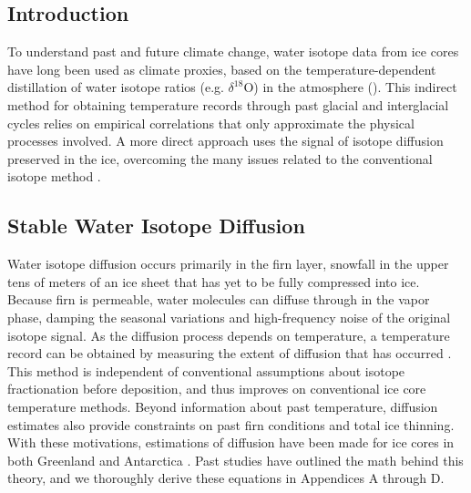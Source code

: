 \documentclass[draft, jgrga]{AGUTeX}
\begin{document}


\begin{article}

\section{Introduction}

To understand past and future climate change, water isotope data from ice cores have long been used as climate proxies, based on the temperature-dependent distillation of water isotope ratios (e.g. $\delta^{18}$O) in the atmosphere (\citep{Epstein1951,Dansgaard1954,Dansgaard1964}). This indirect method for obtaining temperature records through past glacial and interglacial cycles relies on empirical correlations that only approximate the physical processes involved. A more direct approach uses the signal of isotope diffusion preserved in the ice, overcoming the many issues related to the conventional
isotope method \citep{Johnsen2000}.

\subsection{Stable Water Isotope Diffusion}

Water isotope diffusion occurs primarily in the firn layer, snowfall in the upper tens of meters of an ice sheet that has yet to be fully compressed into ice. Because firn is permeable, water molecules can diffuse through in the vapor phase, damping the seasonal variations and high-frequency noise of the original isotope signal. As the diffusion process depends on temperature, a temperature record can be obtained by measuring the extent of diffusion that has occurred \citep{Johnsen2000}. This method is independent of conventional assumptions about isotope fractionation before deposition, and thus improves on conventional ice core temperature methods. Beyond information about past temperature, diffusion estimates also provide constraints on past firn conditions and total ice thinning. With these motivations, estimations of diffusion have been made for ice cores in both Greenland and Antarctica \citep{Simonsen2011,Gkinis2014,vanderWel2015,Jones2017a}. Past studies have outlined the math behind this theory, and we thoroughly derive these equations in Appendices A through D.


\end{article}
\end{document}
